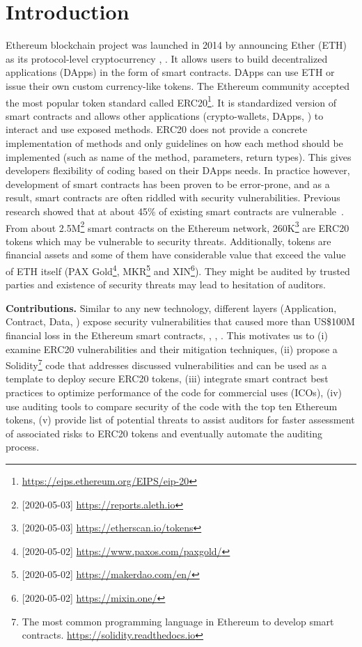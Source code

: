 
\section{Introduction}
\label{sect:introduction}

Ethereum blockchain project was launched in 2014 by announcing Ether (ETH) as its protocol-level cryptocurrency \cite{EthGit}, \cite{EIP150}. It allows users to build decentralized applications (DApps) in the form of smart contracts. DApps can use ETH or issue their own custom currency-like tokens. The Ethereum community accepted the most popular token standard called ERC20\footnote{\url{https://eips.ethereum.org/EIPS/eip-20}}. It is standardized version of smart contracts and allows other applications (\eg crypto-wallets, DApps, \etc) to interact and use exposed methods. ERC20 does not provide a concrete implementation of methods and only guidelines on how each method should be implemented (such as name of the method, parameters, return types). This gives developers flexibility of coding based on their DApps needs. In practice however, development of smart contracts has been proven to be error-prone, and as a result, smart contracts are often riddled with security vulnerabilities. Previous research showed that at about 45\% of existing smart contracts are vulnerable~\cite{MakSm}. From about 2.5M\footnote{[2020-05-03] \url{https://reports.aleth.io}} smart contracts on the Ethereum network, 260K\footnote{[2020-05-03] \url{https://etherscan.io/tokens}} are ERC20 tokens which may be vulnerable to security threats. Additionally, tokens are financial assets and some of them have considerable value that exceed the value of ETH itself (\eg PAX Gold\footnote{[2020-05-02] \url{https://www.paxos.com/paxgold/}}, MKR\footnote{[2020-05-02] \url{https://makerdao.com/en/}} and XIN\footnote{[2020-05-02] \url{https://mixin.one/}}). They might be audited by trusted parties and existence of security threats may lead to hesitation of auditors.\newline

\noindent\textbf{Contributions.} Similar to any new technology, different layers (\eg Application, Contract, Data, \etc) expose security vulnerabilities that caused more than US\$100M financial loss in the Ethereum smart contracts\cite{DAO1}, \cite{PeckShield}, \cite{PartiyMultiSig}, \cite{MyEthWallet}. This motivates us to (i) examine ERC20 vulnerabilities and their mitigation techniques, (ii) propose a Solidity\footnote{The most common programming language in Ethereum to develop smart contracts. \url{https://solidity.readthedocs.io}} code that addresses discussed vulnerabilities and can be used as a template to deploy secure ERC20 tokens, (iii) integrate smart contract best practices to optimize performance of the code for commercial uses (\eg ICOs), (iv) use auditing tools to compare security of the code with the top ten Ethereum tokens, (v) provide list of potential threats to assist auditors for faster assessment of associated risks to ERC20 tokens and eventually automate the auditing process.